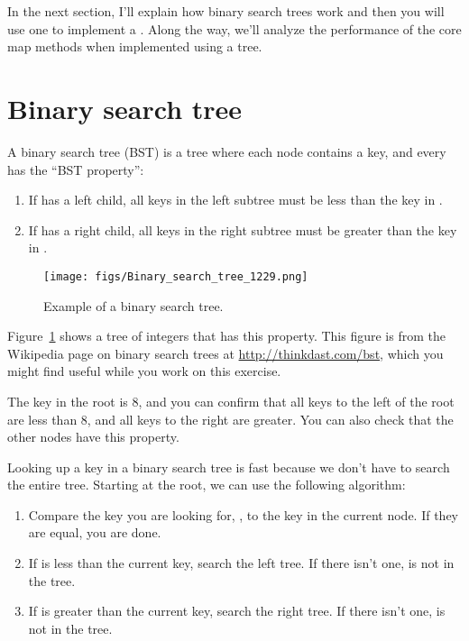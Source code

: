 \documentclass[12pt]{book}
\theoremstyle{exercise}
\begin{document}
In the next section, I'll explain how binary search trees work and then you
will use one to implement a . Along the way, we'll analyze
the performance of the core map methods when implemented using a tree.



\section{Binary search tree}
\label{binary-search-tree}


A binary search tree (BST) is a tree where each node contains a key, and
every  has the ``BST property'':

\begin{enumerate}

\item
  If  has a left child, all keys in the left subtree must
  be less than the key in .

\item
  If  has a right child, all keys in the right subtree must
  be greater than the key in .

\end{enumerate}

\begin{figure}
\centering
\texttt{[image: figs/Binary\_search\_tree\_1229.png]}
\caption{Example of a binary search tree.}
\label{fig-bst}
\end{figure}

Figure~\ref{fig-bst}
shows a tree of integers that has this property.
This figure is from the Wikipedia page on binary search trees at
\url{http://thinkdast.com/bst}, which you
might find useful while you work on this exercise.

The key in the root is 8, and you can confirm that all keys to the left
of the root are less than 8, and all keys to the right are greater. You
can also check that the other nodes have this property.


Looking up a key in a binary search tree is fast because we don't have
to search the entire tree. Starting at the root, we can use the
following algorithm:

\begin{enumerate}

\item
  Compare the key you are looking for, , to the key in
  the current node. If they are equal, you are done.

\item
  If  is less than the current key, search the left tree.
  If there isn't one,  is not in the tree.

\item
  If  is greater than the current key, search the right
  tree. If there isn't one,  is not in the tree.

\end{enumerate}
\end{document}
